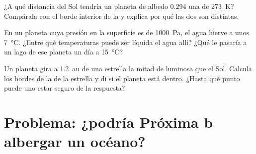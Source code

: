 \begin{exercise}[$\star\star\star$]\label{exo:g10:habitable-planet:13}
¿A qué distancia del Sol tendría un planeta de albedo 0.294 una  de \qty{273}{K}? Compárala con el borde interior de la  y explica por qué las dos son distintas.
\end{exercise}

\begin{exercise}[$\star\star\star$]\label{exo:g10:habitable-planet:14}
En un planeta cuya presión en la superficie es de \qty{1000}{Pa}, el agua
hierve a unos \qty{7}{\degreeCelsius}. ¿Entre qué temperaturas puede ser
líquida el agua allí? ¿Qué le pasaría a un lago de ese planeta un día a
\qty{15}{\degreeCelsius}?
\end{exercise}

\begin{exercise}[$\star\star\star$]\label{exo:g10:habitable-planet:15}
Un planeta gira a \qty{1.2}{au} de una estrella la mitad de luminosa que el
Sol. Calcula los bordes de la  de la estrella y di si el
planeta está dentro. ¿Hasta qué punto puede uno estar seguro de la
respuesta?
\end{exercise}

\section{Problema: ¿podría Próxima b albergar un océano?}

